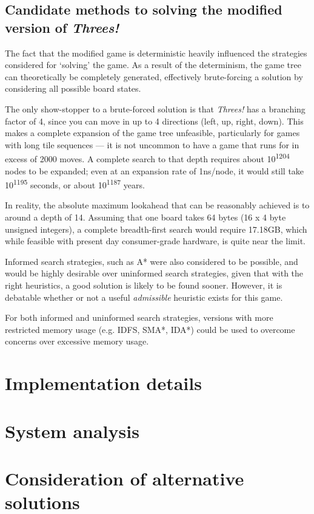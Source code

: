 \documentclass[a4paper, 11pt, titlepage]{report}
\newcommand{\ts}{\textsuperscript}
\newcommand{\threes}{\emph{Threes!}}
\begin{document}

\section{Candidate methods to solving the modified version of \threes{}}
The fact that the modified game is deterministic heavily influenced the strategies considered for `solving' the game. As a result of the determinism, the game tree can theoretically be completely generated, effectively brute-forcing a solution by considering all possible board states.

The only show-stopper to a brute-forced solution is that \threes{} has a branching factor of 4, since you can move in up to 4 directions (left, up, right, down). This makes a complete expansion of the game tree unfeasible, particularly for games with long tile sequences --- it is not uncommon to have a game that runs for in excess of 2000 moves. A complete search to that depth requires about 10\ts{1204} nodes to be expanded; even at an expansion rate of 1ns/node, it would still take 10\ts{1195} seconds, or about 10\ts{1187} years.  

In reality, the absolute maximum lookahead that can be reasonably achieved is to around a depth of 14. Assuming that one board takes 64 bytes (16 x 4 byte unsigned integers), a complete breadth-first search would require 17.18GB, which while feasible with present day consumer-grade hardware, is quite near the limit. 

Informed search strategies, such as A* were also considered to be possible, and would be highly desirable over uninformed search strategies, given that with the right heuristics, a good solution is likely to be found sooner. However, it is debatable whether or not a useful \emph{admissible} heuristic exists for this game. 

For both informed and uninformed search strategies, versions with more restricted memory usage (e.g. IDFS, SMA*, IDA*) could be used to overcome concerns over excessive memory usage.

\chapter{Implementation details}

\chapter{System analysis}

\chapter{Consideration of alternative solutions}

\renewcommand{\bibname}{References}

  
\end{document}
